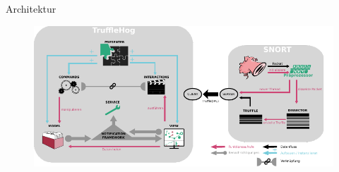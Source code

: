\begin{frame}{Architektur}
    \begin{figure}
    	\centering
    	\includegraphics[width=\textwidth]{./images/20.pdf}
    \end{figure}
\end{frame}
